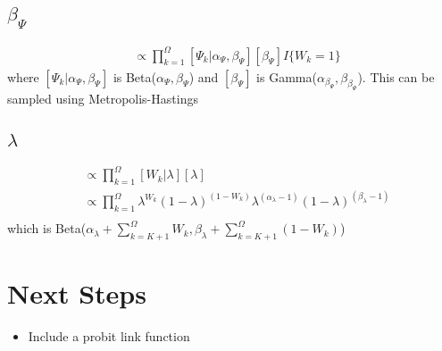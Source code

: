 \documentclass[fleqn]{article}
\begin{document}
\subsection{$\beta_\Psi$}
%
\begin{align*}
  [\beta_\Psi | \cdot] & \propto \prod_{k = 1}^\Omega [\Psi_k | \alpha_\Psi, \beta_\Psi] [\beta_\Psi] I\{W_k = 1\}
\end{align*}
where $[\Psi_k | \alpha_\Psi, \beta_\Psi]$ is Beta($\alpha_\Psi, \beta_\Psi$) and $[\beta_\Psi]$ is Gamma($\alpha_{\beta_\Psi}, \beta_{\beta_\Psi}$). This can be sampled using Metropolis-Hastings
%
\subsection{$\lambda$}
%
\begin{align*}
  [\lambda | \cdot ] & \propto \prod_{k = 1}^\Omega [W_k | \lambda] [\lambda]\\
  & \propto  \prod_{k = 1}^\Omega \lambda^{W_k} (1 - \lambda)^{(1 - W_k)} \lambda^{(\alpha_\lambda - 1)} (1 - \lambda)^{(\beta_\lambda - 1)}\\
\end{align*}
%
which is Beta($\alpha_\lambda + \sum_{k = K + 1}^\Omega W_k, \beta_\lambda + \sum_{k = K + 1}^\Omega (1 - W_k)$)
%
\section{Next Steps}
\begin{itemize}
  \item Include a probit link function
\end{itemize}
\end{document}
